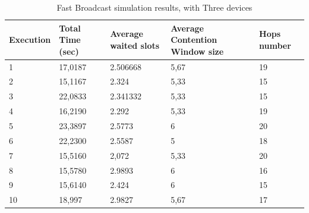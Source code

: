 \begin{table}
\caption{Fast Broadcast simulation results, with Three devices}
\label{tab:Android_res}
\centering
\begin{tabular}{|m{}|m{}|m{}|m{}|m{}|}
\hline
Execution & Total \newline Time (sec) & Average waited slots & Average Contention Window size & Hops \newline number \\
\hline
1 & 17,0187 & 2.506668 & 5,67 & 19 \\
\hline
2 & 15,1167 & 2.324	  & 5,33 & 15 \\ %
\hline
3 & 22,0833 & 2.341332 & 5,33 & 15 \\  
\hline
4 & 16,2190 & 2.292	  & 5,33 & 19 \\ %
\hline
5 & 23,3897 & 2.5773 & 6	 & 20 \\ %
\hline
6 & 22,2300 & 2.5587 & 5	 & 18 \\ %
\hline
7 & 15,5160 & 2,072	  & 5,33 & 20 \\ %
\hline
8 & 15,5780 & 2.9893 & 6	 & 16 \\ %
\hline
9 & 15,6140 & 2.424     & 6	 & 15 \\ %
\hline
10 & 18,997 & 2.9827 & 5,67 & 17 \\ %
\hline
\end{tabular}
\end{table}  

